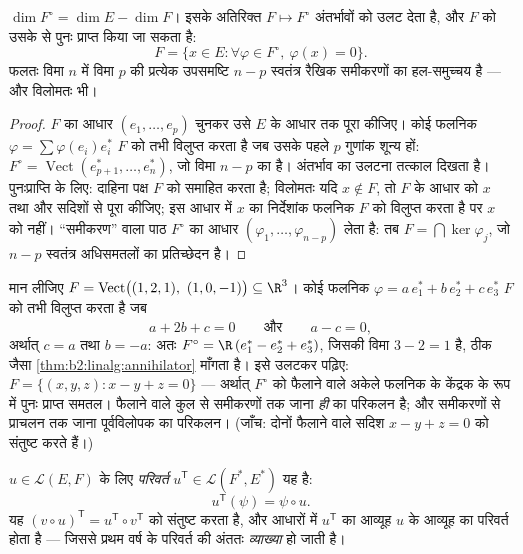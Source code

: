 \begin{theorem}[विलोपक की विमा]\label{thm:b2:linalg:annihilator}
$\dim F^{\circ} = \dim E - \dim F$। इसके अतिरिक्त $F \mapsto F^\circ$ अंतर्भावों को उलट देता है, और $F$ को उसके
 से पुनः प्राप्त किया जा सकता है:
\[
F = \{x \in E : \forall\varphi \in F^\circ,\ \varphi(x) = 0\}.
\]
फलतः विमा $n$ में विमा $p$ की प्रत्येक उपसमष्टि $n - p$ स्वतंत्र रैखिक
समीकरणों का हल-समुच्चय है --- और विलोमतः भी।
\end{theorem}

\begin{proof}
$F$ का आधार $(e_1, \dots, e_p)$ चुनकर उसे $E$ के आधार तक पूरा कीजिए। कोई फलनिक $\varphi = \sum \varphi(e_i) e_i^*$
$F$ को तभी विलुप्त करता है जब उसके पहले $p$ गुणांक शून्य हों: $F^\circ =
\operatorname{Vect}(e_{p+1}^*, \dots, e_n^*)$, जो
विमा $n - p$ का है। अंतर्भाव का उलटना तत्काल दिखता है। पुनःप्राप्ति के
लिए: दाहिना पक्ष $F$ को समाहित करता है; विलोमतः यदि $x \notin F$, तो $F$ के
आधार को $x$ तथा और सदिशों से पूरा कीजिए; इस आधार में $x$ का
निर्देशांक फलनिक $F$ को विलुप्त करता है पर $x$ को नहीं।
``समीकरण'' वाला पाठ $F^\circ$ का आधार $(\varphi_1, \dots, \varphi_{n-p})$ लेता है: तब $F =
\bigcap \ker\varphi_j$, जो $n - p$
स्वतंत्र अधिसमतलों का प्रतिच्छेदन है।
\end{proof}

\begin{example}[एक विलोपक, दोनों दिशाओं में]\label{ex:b2:linalg:annihilatorwork}
मान लीजिए $F = \operatorname{Vect}\bigl((1, 2, 1),\ (1, 0, -1)\bigr)
\subseteq \R^3$। कोई फलनिक $\varphi = a\,e_1^* + b\,e_2^* + c\,e_3^*$ $F$ को तभी विलुप्त करता है जब
\[
a + 2b + c = 0
\qquad\text{और}\qquad
a - c = 0 ,
\]
अर्थात् $c = a$ तथा $b = -a$: अतः $F^\circ = \R\,(e_1^* - e_2^* +
e_3^*)$, जिसकी विमा $3 - 2 = 1$ है, ठीक जैसा \cref{thm:b2:linalg:annihilator}
माँगता है। इसे उलटकर पढ़िए: $F = \{(x, y, z) : x - y + z = 0\}$ --- अर्थात् $F^\circ$ को फैलाने वाले
अकेले फलनिक के केंद्रक के रूप में पुनः प्राप्त समतल। फैलाने वाले कुल
से समीकरणों तक जाना \emph{ही}  का परिकलन है; और समीकरणों से
प्राचलन तक जाना पूर्वविलोपक का परिकलन। (जाँच: दोनों फैलाने वाले सदिश
$x - y +
z = 0$ को संतुष्ट करते हैं।)
\end{example}

\begin{definition}[परिवर्त प्रतिचित्रण]\label{def:b2:linalg:transpose}
$u \in \mathcal{L}(E, F)$ के लिए \emph{परिवर्त} $u^{\mathsf T} \in \mathcal{L}(F^*, E^*)$ यह है:
\[
u^{\mathsf T}(\psi) = \psi \circ u .
\]
यह $(v \circ u)^{\mathsf T} = u^{\mathsf T} \circ v^{\mathsf
T}$ को संतुष्ट करता है, और  आधारों में $u^{\mathsf T}$ का आव्यूह $u$ के
आव्यूह का परिवर्त होता है --- जिससे प्रथम वर्ष के परिवर्त की अंततः
\emph{व्याख्या} हो जाती है।
\end{definition}

